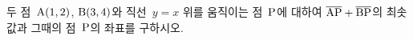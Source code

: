 두 점~$\mathrm{A}(1{,}\mkern3mu\mathopen{}2)$, $\mathrm{B}(3{,}\mkern3mu\mathopen{}4)$와 직선~$y=x$ 위를 움직이는 점~$\mathrm{P}$에 대하여 $\overline{\mathrm{AP}}+\overline{\mathrm{BP}}$의 최솟값과 그때의 점~$\mathrm{P}$의 좌표를 구하시오.
